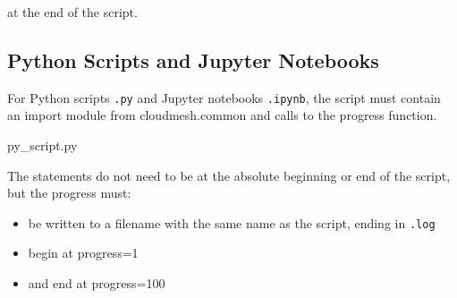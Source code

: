 at the end of the script.

\subsection{Python Scripts and Jupyter
Notebooks}\label{python-scripts-and-jupyter-notebooks}

For Python scripts \texttt{.py} and Jupyter notebooks \texttt{.ipynb},
the script must contain an import module from cloudmesh.common and calls
to the progress function.

py\_script.py

\begin{Shaded}
\begin{Highlighting}[]
\ErrorTok{(}\KeywordTok{)}
\ErrorTok{(}\OperatorTok{=}\OperatorTok{=}\KeywordTok{)}


\ErrorTok{(}\OperatorTok{=}\OperatorTok{=}\KeywordTok{)}
\end{Highlighting}
\end{Shaded}

The statements do not need to be at the absolute beginning or end of the
script, but the progress must:

\begin{itemize}
\tightlist
\item
  be written to a filename with the same name as the script, ending in
  \texttt{.log}
\item
  begin at progress=1
\item
  and end at progress=100
\end{itemize}
